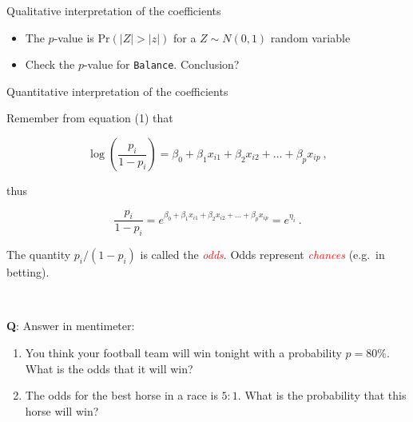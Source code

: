 \documentclass[
  10pt,
  ignorenonframetext,
]{beamer}
\providecommand{\tightlist}{%
  \setlength{\itemsep}{0pt}\setlength{\parskip}{0pt}}
\begin{document}
\begin{frame}[fragile]
\begin{block}{Qualitative interpretation of the coefficients}
\vspace{2mm}

\begin{itemize}
\tightlist
\item
  The \(p\)-value is \(\text{Pr}(|Z| > |z|)\) for a \(Z\sim N(0,1)\)
  random variable
\end{itemize}

\vspace{2mm}

\begin{itemize}
\tightlist
\item
  Check the \(p\)-value for \texttt{Balance}. Conclusion?
\end{itemize}
\end{block}
\end{frame}

\begin{frame}
\begin{block}{Quantitative interpretation of the coefficients}
\protect\hypertarget{quantitative-interpretation-of-the-coefficients}{}
\vspace{2mm}

Remember from equation (1) that

\begin{equation*}
\log\left( \frac{p_i}{1-p_i} \right) = \beta_0 + \beta_1 x_{i1} + \beta_2 x_{i2} + \ldots + \beta_p x_{ip} \ ,
\end{equation*}

thus

\begin{equation*}
 \frac{p_i}{1-p_i} = e^{\beta_0 + \beta_1 x_{i1} + \beta_2 x_{i2} + \ldots + \beta_p x_{ip}} = e^{\eta_i} \ .
\end{equation*}

\vspace{2mm}

The quantity \(p_i/(1-p_i)\) is called the \emph{\textcolor{red}{odds}}.
Odds represent \emph{\textcolor{red}{chances}} (e.g.~in betting).

\(~\)

\textbf{Q}: Answer in mentimeter:

\begin{enumerate}
\item
  You think your football team will win tonight with a probability
  \(p=80\%\). What is the odds that it will win?
\item
  The odds for the best horse in a race is \(5:1\). What is the
  probability that this horse will win?
\end{enumerate}
\end{block}
\end{frame}
\end{document}
